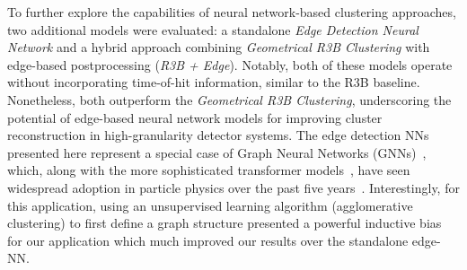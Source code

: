 To further explore the capabilities of neural network-based clustering approaches, two additional models were evaluated: a standalone \textit{Edge Detection Neural Network} and a hybrid approach combining \textit{Geometrical R3B Clustering} with edge-based postprocessing (\textit{R3B + Edge}). Notably, both of these models operate without incorporating time-of-hit information, similar to the R3B baseline. Nonetheless, both outperform the \textit{Geometrical R3B Clustering}, underscoring the potential of edge-based neural network models for improving cluster reconstruction in high-granularity detector systems.\newline
The edge detection NNs presented here represent a special case of Graph Neural Networks (GNNs)~\cite{battaglia2018relational}, which, along with the more sophisticated transformer models~\cite{vaswani2017attention,amatriain2023transformer}, have seen widespread adoption in particle physics over the past five years~\cite{dezoort2021charged,ju2021performance,van2024transformers}. Interestingly, for this application, using an unsupervised learning algorithm (agglomerative clustering) to first define a graph structure presented a powerful inductive bias for our application which much improved our results over the standalone edge-NN.


